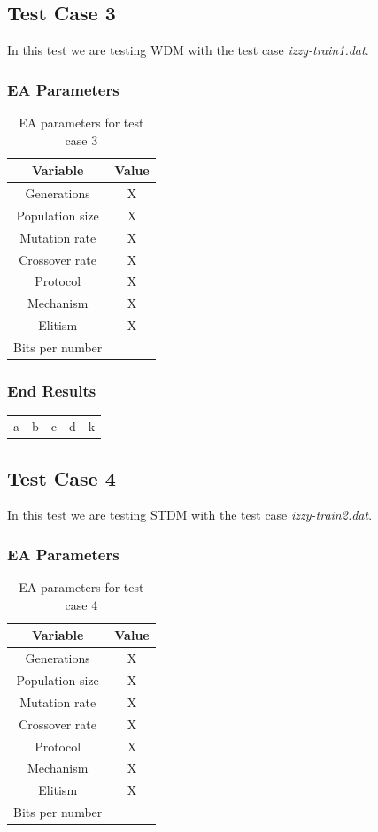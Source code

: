 \subsection{Test Case 3}\label{sec:test-case-3}
In this test we are testing WDM with the test case
\textit{izzy-train1.dat}.
\subsubsection{EA Parameters}\label{sec:test-case-3-parameters}
\begin{table}
	\begin{tabular}{c c}
		Variable & Value \\
		\hline
		Generations & X \\
		\hline
		Population size & X \\
		\hline
		Mutation rate & X \\
		\hline
		Crossover rate & X \\
		\hline
		Protocol & X \\
		\hline
		Mechanism & X \\
		\hline
		Elitism & X \\
		\hline
		Bits per number & \\
	\end{tabular}
	\caption{EA parameters for test case 3}
\end{table}
\subsubsection{End Results}\label{sec:test-case-3-results}
\begin{table}
	\begin{tabular}{c c c c c}
		a & b & c & d & k \\
	\end{tabular}
\end{table}

\subsection{Test Case 4}\label{sec:test-case-4}
In this test we are testing STDM with the test case
\textit{izzy-train2.dat}.
\subsubsection{EA Parameters}\label{sec:test-case-4-parameters}
\begin{table}
	\begin{tabular}{c c}
		Variable & Value \\
		\hline
		Generations & X \\
		\hline
		Population size & X \\
		\hline
		Mutation rate & X \\
		\hline
		Crossover rate & X \\
		\hline
		Protocol & X \\
		\hline
		Mechanism & X \\
		\hline
		Elitism & X \\
		\hline
		Bits per number & \\
	\end{tabular}
	\caption{EA parameters for test case 4}
\end{table}
